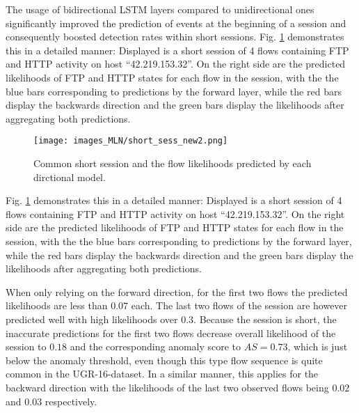 The usage of bidirectional LSTM layers compared to unidirectional ones significantly improved the prediction of events at the beginning of a session and consequently boosted detection rates within short sessions. Fig. \ref{figF:short_sess} demonstrates this in a detailed manner: Displayed is a short session of 4 flows containing FTP and HTTP activity on host ``42.219.153.32''. On the right side are the predicted likelihoods of FTP and HTTP states for each flow in the session, with the the blue bars corresponding to predictions by the forward layer, while the red bars display the backwards direction and the green bars display the likelihoods after aggregating both predictions. %

\begin{figure}[ht]
\centering
\texttt{[image: images\_MLN/short\_sess\_new2.png]} \caption{Common short session and the flow likelihoods predicted by each dirctional model.}\label{figF:short_sess}
\end{figure}

Fig. \ref{figF:short_sess} demonstrates this in a detailed manner: Displayed is a short session of 4 flows containing FTP and HTTP activity on host ``42.219.153.32''. On the right side are the predicted likelihoods of FTP and HTTP states for each flow in the session, with the the blue bars corresponding to predictions by the forward layer, while the red bars display the backwards direction and the green bars display the likelihoods after aggregating both predictions. 

When only relying on the forward direction, for the first two flows the predicted likelihoods are less than $0.07$ each. 
The last two flows of the session are however predicted well with high likelihoods over $0.3$. Because the session is short, the inaccurate predictions for the first two flows decrease overall likelihood of the session to $0.18$ and the corresponding anomaly score to $AS=0.73$, which is just below the anomaly threshold, even though this type flow sequence is quite common in the UGR-16-dataset.
In a similar manner, this applies for the backward direction with  the likelihoods of the last two observed flows being $0.02$ and $0.03$ respectively. 

